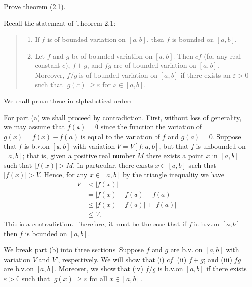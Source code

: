 \begin{problem}
  Prove theorem (2.1).
\end{problem}
\begin{solution}
  Recall the statement of Theorem 2.1:
  \begin{quote}
    \begin{enumerate}[label=(\alph*)]
    \item If \(f\) is of bounded variation on \([a,b]\), then \(f\) is bounded on
      \([a,b]\).
    \item Let \(f\) and \(g\) be of bounded variation on \([a,b]\). Then
      \(cf\) (for any real constant \(c\)), \(f+g\), and \(fg\) are of
      bounded variation on \([a,b]\). Moreover, \(f/g\) is of bounded
      variation on \([a,b]\) if there exists an \(\varepsilon>0\) such that
      \(|g(x)|\geq\varepsilon\) for \(x\in[a,b]\).
    \end{enumerate}
  \end{quote}
  \noindent%
  We shall prove these in alphabetical order:

  For part (a) we shall proceed by contradiction. First, without loss of
  generality, we may assume that \(f(a)=0\) since the function the
  variation of \(g(x)=f(x)-f(a)\) is equal to the variation of \(f\) and
  \(g(a)=0\).  Suppose that \(f\) is b.v.\@ on \([a,b]\) with variation
  \(V=V[f;a,b]\), but that \(f\) is unbounded on \([a,b]\); that is, given
  a positive real number \(M\) there exists a point \(x\) in \([a,b]\) such
  that \(|f(x)|>M\). In particular, there exists \(x\in[a,b]\) such that
  \(|f(x)|>V\). Hence, for any \(x\in[a,b]\) by the triangle inequality we
  have
  \begin{align*}
    V&<|f(x)|\\
     &=|f(x)-f(a)+f(a)|\\
     &\leq|f(x)-f(a)|+|f(a)|\\
     &\leq V.
  \end{align*}
  This is a contradiction. Therefore, it must be the case that if \(f\) is
  b.v.\@ on \([a,b]\) then \(f\) is bounded on \([a,b]\).

  We break part (b) into three sections. Suppose \(f\) and \(g\) are b.v.\@
  on \([a,b]\) with variation \(V\) and \(V'\), respectively.  We will show
  that (i) \(cf\); (ii) \(f+g\); and (iii) \(fg\) are b.v.\@ on
  \([a,b]\). Moreover, we show that (iv) \(f/g\) is b.v.\@ on \([a,b]\) if
  there exists \(\varepsilon>0\) such that \(|g(x)|\geq\varepsilon\) for
  all \(x\in[a,b]\).


\end{solution}

